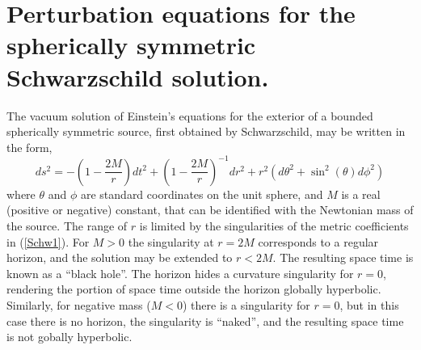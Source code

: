 \documentclass[12pt,aps,floats,showpacs,amssymb,tightenlines]{revtex4}
\begin{document}
\section{Perturbation equations for the spherically symmetric Schwarzschild solution.} \label{rw}

The vacuum solution of Einstein's equations for the exterior of a bounded spherically symmetric source,
first obtained by Schwarzschild, may be written in the form,
\begin{equation}
\label{Schw1}
ds^2 =  -\left(1-\frac{2 M}{r}\right) dt^2 +
 \left(1-\frac{2 M}{r}\right)^{-1} dr^2   +r^2 \left( d \theta^2 +  \sin^2(\theta)
d \phi^2 \right)
\end{equation}
where $\theta$ and $\phi$ are standard coordinates on the unit sphere, and $M$ is a real
(positive or negative) constant, that can be identified with the Newtonian mass of the source.
The range of $r$ is limited by the singularities of the metric coefficients in (\ref{Schw1}).
 For $M>0$ the singularity at $r=2M$ corresponds to a regular horizon, and the solution may be
extended to $r<2M$. The resulting space time is known as a ``black
hole''. The horizon hides
  a curvature singularity for $r=0$, rendering the portion of space time outside the horizon
  globally hyperbolic. Similarly, for negative mass ($M<0$) there is a singularity for $r=0$,
   but in this case there is no horizon, the singularity is ``naked'', and the resulting space
    time is not gobally hyperbolic.
\end{document}

